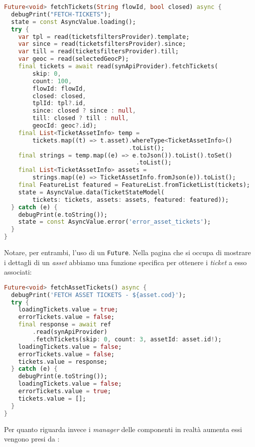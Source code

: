 \begin{lstlisting}[language=dart, label={lst:mobilesyn_ticket_provider}, firstnumber=1,caption={mobilesyn \textit{ticket provider}}]
Future<void> fetchTickets(String flowId, bool closed) async {
  debugPrint("FETCH-TICKETS");
  state = const AsyncValue.loading();
  try {
    var tpl = read(ticketsfiltersProvider).template;
    var since = read(ticketsfiltersProvider).since;
    var till = read(ticketsfiltersProvider).till;
    var geoc = read(selectedGeocP);
    final tickets = await read(synApiProvider).fetchTickets(
        skip: 0,
        count: 100,
        flowId: flowId,
        closed: closed,
        tplId: tpl?.id,
        since: closed ? since : null,
        till: closed ? till : null,
        geocId: geoc?.id);
    final List<TicketAssetInfo> temp =
        tickets.map((t) => t.asset).whereType<TicketAssetInfo>()
                                   .toList();
    final strings = temp.map((e) => e.toJson()).toList().toSet()
                                     .toList();
    final List<TicketAssetInfo> assets =
        strings.map((e) => TicketAssetInfo.fromJson(e)).toList();
    final FeatureList featured = FeatureList.fromTicketList(tickets);
    state = AsyncValue.data(TicketStateModel(
        tickets: tickets, assets: assets, featured: featured));
  } catch (e) {
    debugPrint(e.toString());
    state = const AsyncValue.error('error_asset_tickets');
  }
}
\end{lstlisting} 

Notare, per entrambi, l'uso di un \verb+Future+. Nella pagina che si occupa di mostrare i dettagli di un \textit{asset} abbiamo una funzione specifica per ottenere i \textit{ticket} a esso associati:

\begin{lstlisting}[language=dart, label={lst:mobilesyn_asset_ticket_provider}, firstnumber=1,caption={mobilesyn \textit{asset ticket provider}}]
Future<void> fetchAssetTickets() async {
  debugPrint('FETCH ASSET TICKETS - ${asset.cod}');
  try {
    loadingTickets.value = true;
    errorTickets.value = false;
    final response = await ref
        .read(synApiProvider)
        .fetchTickets(skip: 0, count: 3, assetId: asset.id!);
    loadingTickets.value = false;
    errorTickets.value = false;
    tickets.value = response;
  } catch (e) {
    debugPrint(e.toString());
    loadingTickets.value = false;
    errorTickets.value = true;
    tickets.value = [];
  }
}
\end{lstlisting} 

Per quanto riguarda invece i \textit{manager} delle componenti in realtà aumenta essi vengono presi da \aplug{}:


